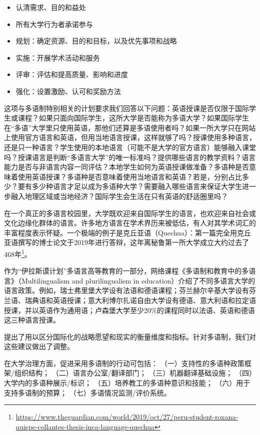 \documentclass[output=paper]{langscibook}
\begin{document}
\begin{itemize}
\item 认清需求、目的和益处 
\item 所有大学行为者承诺参与
\item 规划：确定资源、目的和目标，以及优先事项和战略 
\item 实施：开展学术活动和服务 
\item 评审：评估和提高质量、影响和进度 
\item 强化：设置激励、认可和奖励方法
\end{itemize}

这项与多语制特别相关的计划要求我们回答以下问题：英语授课是否仅限于国际学生或课程？如果只面向国际学生，这所大学是否能称为多语大学？如果国际学生在“多语”大学里只使用英语，那他们还算是多语使用者吗？如果一所大学只在网站上使用官方语言和英语，但用当地语言授课，这样就够了吗？授课使用多种语言，还是只一种语言？学生使用的本地语言（可能不是大学的官方语言）能够融入课堂吗？授课语言是判断“多语言大学”的唯一标准吗？提供哪些语言的教学资料？语言能力是否与非语言内容一同评估？本地学生如何为英语授课做准备？多语种是否意味着使用英语授课？多语种是否意味着使用当地语言和英语？若是，分别占比多少？要有多少种语言才足以成为多语种大学？需要融入哪些语言来保证大学生进一步融入地理区域或当地经济？国际学生会生活在只有英语的舒适圈里吗？

在一个真正的多语言校园里，大学既欢迎来自国际学生的语言，也欢迎来自社会或文化边缘化群体的语言。许多地方语言在学术界历来被低估，有人对其学术词汇的丰富程度表示怀疑。一个极端的例子是克丘亚语（Quechua）：第一篇完全用克丘亚语撰写的博士论文于2019年进行答辩，这年离秘鲁第一所大学成立大约过去了468年\footnote{\url{https://www.theguardian.com/world/2019/oct/27/peru-student-roxana-quispe-collantes-thesis-inca-language-quechua}}。

作为“伊拉斯谟计划”多语言高等教育\citet{MultilingualHigherEducation2016}的一部分，网络课程《多语制和教育中的多语言》（Multilingualism and plurilingualism in education）介绍了不同多语言大学的语言政策。例如，瑞士弗里堡大学设有法语和德语课程；芬兰赫尔辛基大学设有芬兰语、瑞典语和英语授课；意大利博尔扎诺自由大学设有德语、意大利语和拉定语授课，并以英语作为通用语；卢森堡大学至少20\%的课程同时以法语、英语和德语这三种语言授课。

\citet[89]{Gao2019} 提出了用以区分国际化的战略愿望和现实的衡量维度和指标。针对多语制，我们对这些建议做出了调整。

在大学治理方面，促进采用多语制的行动可包括：
（一）支持性的多语种政策框架/组织结构；
（二）语言办公室/翻译部门；
（三）机器翻译基础设施；
（四）大学内的多语种展示/标识；
（五）培养教工的多语种意识和技能；
（六）用于支持多语制的预算；
（七）多语情况监测/评价系统。
\end{document}
